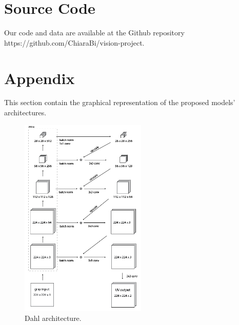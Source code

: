 \documentclass[10pt,twocolumn,letterpaper]{article}
\begin{document}







\clearpage
\onecolumn

\section*{Source Code}
Our code and data are available at the Github repository https://github.com/ChiaraBi/vision-project.

{\small


}


\section*{Appendix}
This section contain the graphical representation of the proposed models' architectures.

\begin{figure}[htbp]
	\centering
	\includegraphics[width=6cm]{diagram dahl.jpg}
	\caption{Dahl architecture.}
	\label{fig:dahl}
\end{figure}
\end{document}
